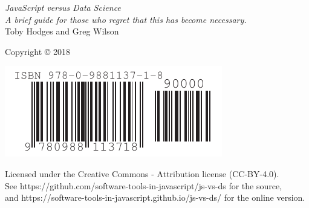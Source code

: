 \documentclass[10pt,letterpaper]{memoir}
\begin{document}
\pagestyle{empty}

{\begingroup
  \raggedleft
  \vspace*{\baselineskip}

  {\Huge\itshape JavaScript versus Data Science}\\[\baselineskip]

  {\large\itshape
    A brief guide for those who regret that this has become necessary.
  }\\[0.2\textheight]

  {\large Toby Hodges and Greg Wilson}\par

  \vfill

  {\large Copyright {\copyright} 2018}

  \vspace*{\baselineskip}

  \includegraphics{../../etc/isbn-barcode.pdf}

  \vspace*{\baselineskip}

  {\small
    Licensed under the Creative Commons - Attribution license (CC-BY-4.0).
    \\
    See https://github.com/software-tools-in-javascript/js-vs-ds for the source,\\
    and https://software-tools-in-javascript.github.io/js-vs-ds/ for the online version.
  }

\endgroup}

\newpage

\pagestyle{empty}

~

\newpage

\tableofcontents

\newpage

\pagestyle{empty}

~

\newpage

\pagestyle{plain}


\end{document}
